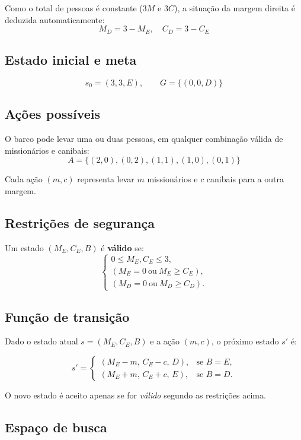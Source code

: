 \documentclass[9pt,a4paper]{extarticle}
\begin{document}
Como o total de pessoas é constante ($3M$ e $3C$), a situação da margem direita é deduzida automaticamente:
\[
M_D = 3 - M_E, \quad C_D = 3 - C_E
\]

\subsection*{Estado inicial e meta}

\[
s_0 = (3, 3, E), \qquad G = \{(0, 0, D)\}
\]

\subsection*{Ações possíveis}

O barco pode levar uma ou duas pessoas, em qualquer combinação válida de missionários e canibais:
\[
A = \{(2,0), (0,2), (1,1), (1,0), (0,1)\}
\]

Cada ação $(m,c)$ representa levar $m$ missionários e $c$ canibais para a outra margem.

\subsection*{Restrições de segurança}

Um estado $(M_E, C_E, B)$ é \textbf{válido} se:
\[
\begin{cases}
0 \le M_E, C_E \le 3, \\
(M_E = 0 \ \text{ou} \ M_E \ge C_E), \\
(M_D = 0 \ \text{ou} \ M_D \ge C_D).
\end{cases}
\]

\subsection*{Função de transição}

Dado o estado atual $s = (M_E, C_E, B)$ e a ação $(m,c)$, o próximo estado $s'$ é:

\[
s' =
\begin{cases}
(M_E - m, \, C_E - c, \, D), & \text{se } B = E,\\[4pt]
(M_E + m, \, C_E + c, \, E), & \text{se } B = D.
\end{cases}
\]

O novo estado é aceito apenas se for \textit{válido} segundo as restrições acima.

\subsection*{Espaço de busca}
\end{document}
